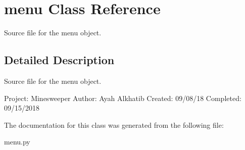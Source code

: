 \hypertarget{classmenu}{}\section{menu Class Reference}
\label{classmenu}


Source file for the menu object.  




\subsection{Detailed Description}
Source file for the menu object. 

Project\+: Minesweeper Author\+: Ayah Alkhatib Created\+: 09/08/18 Completed\+: 09/15/2018 

The documentation for this class was generated from the following file\+:\begin{DoxyCompactItemize}
\item 
menu.\+py\end{DoxyCompactItemize}
